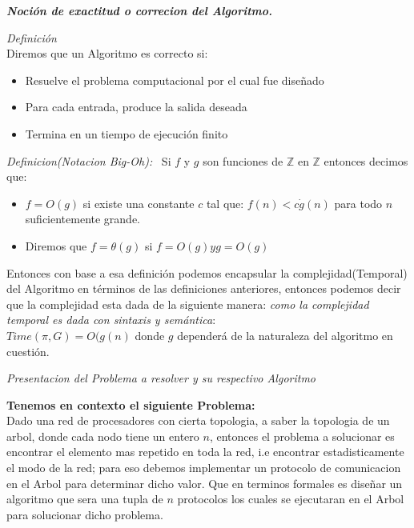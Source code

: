 \documentclass[11pt]{article}
\begin{document}
\textbf{\emph{Noción de exactitud o correcion del Algoritmo.}}

\emph{Definición}\\

Diremos que un Algoritmo es correcto si:
\begin{itemize}
       \item Resuelve el problema computacional por el cual fue diseñado
       \item Para cada entrada, produce la salida deseada
       \item Termina en un tiempo de ejecución finito

\end{itemize}
\emph{Definicion(Notacion Big-Oh):} \
Si $f$ y $g$ son funciones de $\mathbb{Z}$ en $\mathbb{Z}$ entonces decimos que:\
\begin{itemize}
    \item $f = O(g)$ si existe una constante $c$ tal que:
    $f(n) < c\dot g(n)$ para todo $n$ suficientemente grande.
    \item Diremos que $f = \theta(g)$ si $f = O(g) y g = O(g)$
\end{itemize}

Entonces con base a esa definición podemos encapsular la complejidad(Temporal)
del Algoritmo en términos de las definiciones anteriores,
entonces podemos decir que la complejidad esta dada de la siguiente manera:
 \emph{ como la complejidad temporal es dada con sintaxis y semántica}:\\

$ Time( \pi, G) = O(g(n) $ donde $ g $ dependerá de la naturaleza del algoritmo en cuestión.\\
\newpage
\begin{center}
    \begin{Large}
    \textit{Presentacion del Problema a resolver y su respectivo Algoritmo}
    \end{Large}
\end{center}
\textbf{ Tenemos en contexto el siguiente Problema:}
\\
Dado una red de procesadores con cierta topologia, a saber la topologia de un arbol,
donde cada nodo tiene un entero $n$, entonces el problema a solucionar es encontrar el
elemento mas repetido en toda la red, i.e encontrar estadisticamente el modo de la red;
para eso debemos implementar un protocolo de comunicacion en el Arbol para determinar dicho valor.
Que en terminos formales es diseñar un algoritmo que sera una tupla de $n$ protocolos los cuales
se ejecutaran en el Arbol para solucionar dicho problema.
\end{document}
